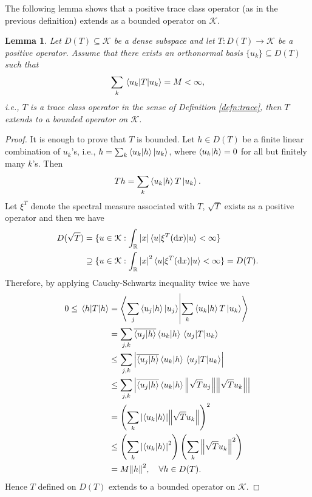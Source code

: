 \documentclass[12pt,a4paper,oneside]{article}
\numberwithin{equation}{section}
\theoremstyle{definition}  %
\theoremstyle{plain}  %
\newtheorem{lem}[defn]{Lemma}
\theoremstyle{remark} %
\newcommand{\CK}{\mathcal{K}}
\newcommand{\BR}{\mathbb{R}}
\begin{document}
The following lemma shows that a positive trace class operator (as in the previous definition) extends as a bounded operator on $\CK$.
\begin{lem}\label{sec:gaussian-states-lem}
 Let $D(T)\subseteq \CK$ be a dense subspace 
 and let $T:D(T)\rightarrow \CK$ be a positive operator. Assume that there exists an orthonormal basis $\{u_k\}\subseteq D(T)$ such that \begin{align*}
     \sum\limits_k \mel{u_k}{T}{u_k} = M<\infty,
 \end{align*} i.e., $T$ is a trace class operator in the sense of Definition \ref{defn:trace},
 then $T$ extends to a bounded  operator on $\CK$.
\end{lem}
\begin{proof}
It is enough to prove that $T$ is bounded. Let $h\in D(T)$ be a finite linear combination of $u_k$'s, i.e., $h = \sum_k \braket{u_k}{h}\ket{u_k}$, where $\braket{u_k}{h} = 0$ for all but finitely many $k$'s. Then \begin{align*}
    Th = \sum_k \braket{u_k}{h}T\ket{u_k}.
\end{align*}
Let $\xi^T$ denote the spectral measure associated with $T$, $\sqrt{T}$ exists as a positive operator and then we have \begin{align*}
    D(\sqrt{T}) &= \{u\in \CK: \int_{\BR}\abs{x}\mel{u}{\xi^T(\dd x)}{u}<\infty\}\\&
    \supseteq \{u\in \CK: \int_{\BR}\abs{x}^2\mel{u}{\xi^T(\dd x)}{u}<\infty\} = D(T).
\end{align*}
 Therefore, by applying Cauchy-Schwartz inequality twice we have
\begin{align*}
  0\leq  \mel{h}{T}{h} &= \braket{\sum \limits_j \braket{u_j}{h}\ket{u_j}}{\sum \limits_k \braket{u_k}{h}T\ket{u_k}}\\ 
    & = \sum\limits_{j,k}\overline{\braket{u_j}{h}}\braket{u_k}{h}\mel{u_j}{T}{u_k}\\
      & \leq \sum\limits_{j,k}\abs{\overline{\braket{u_j}{h}}\braket{u_k}{h}\mel{u_j}{T}{u_k}}\\
    &\leq  \sum\limits_{j,k}\abs{\overline{\braket{u_j}{h}}\braket{u_k}{h}\norm{\sqrt{T}u_j}\norm{\sqrt{T}u_k}}\\
    & = \left(\sum\limits_{k}\abs{\braket{u_k}{h}}\norm{\sqrt{T}u_k}\right)^2\\
    & \leq \left(\sum\limits_{k}\abs{\braket{u_k}{h}}^2\right)\left(\sum\limits_{k}\norm{\sqrt{T}u_k}^2\right)\\
    &= M \norm{h}^2, \quad \forall h\in D(T).
\end{align*}
Hence $T$ defined on $D(T)$ extends to a bounded operator on $\CK$.
\end{proof}
\end{document}
